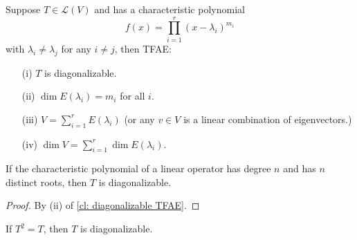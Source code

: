 \begin{corollary} \label{cl: diagonalizable TFAE}
    Suppose \(T \in \mathcal{L} (V)\) and has a characteristic polynomial 
    \[
        f(x) = \prod _{i=1}^r (x - \lambda _i)^{m_i}
    \] with \(\lambda _i \neq \lambda _j\) for any \(i \neq j\), then TFAE: 
    \begin{itemize}
        \item [(i)] \(T\) is diagonalizable. 
        \item [(ii)] \(\dim E(\lambda _i) = m_i\) for all \(i\). 
        \item [(iii)] \(V = \sum_{i=1}^r E(\lambda _i) \) (or any \(v \in V\) is a linear combination of eigenvectors.) 
        \item [(iv)] \(\dim V = \sum_{i=1}^r \dim E(\lambda _i) \).    
    \end{itemize}  
\end{corollary}

\begin{corollary}
    If the characteristic polynomial of a linear operator has degree \(n\) and has \(n\) distinct roots, then \(T\) is diagonalizable.   
\end{corollary}
\begin{proof}
    By (ii) of \autoref{cl: diagonalizable TFAE}. 
\end{proof}

\begin{corollary}
    If \(T^2 = T\), then \(T\) is diagonalizable.  
\end{corollary}